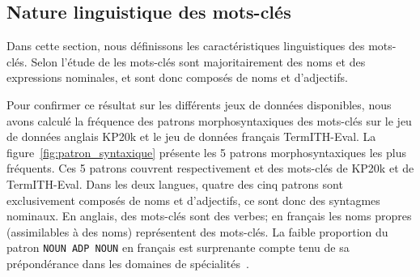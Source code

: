 \subsection{Nature linguistique des mots-clés}
\label{sub:nature_linguistique}

Dans cette section, nous définissons les caractéristiques linguistiques des mots-clés.
Selon l'étude de \citet{hulth_improved_2003} les mots-clés sont majoritairement des noms et des expressions nominales, et sont donc composés de noms et d'adjectifs.



Pour confirmer ce résultat sur les différents jeux de données disponibles, nous avons calculé la fréquence des patrons morphosyntaxiques des mots-clés sur le jeu de données anglais KP20k et le jeu de données français TermITH-Eval.
La figure~\ref{fig:patron_syntaxique} présente les 5 patrons morphosyntaxiques les plus fréquents. %
Ces 5 patrons couvrent respectivement  et  des mots-clés de KP20k et de TermITH-Eval. 
Dans les deux langues, quatre des cinq patrons sont exclusivement composés de noms et d'adjectifs, ce sont donc des syntagmes nominaux.
En anglais,  des mots-clés sont des verbes; en français les noms propres (assimilables à des noms) représentent  des mots-clés. La faible proportion du patron \texttt{NOUN ADP NOUN} en français est surprenante compte tenu de sa prépondérance dans les domaines de spécialités~\cite{daille_term_2017}.
%


